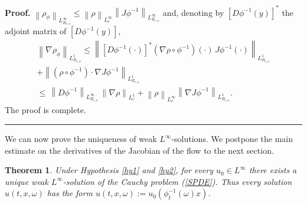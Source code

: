 \documentclass[a4paper,10pt]{article}
\newtheorem{theorem}{Theorem}
\newenvironment{proof}[1][Proof]{\textbf{#1.} }{\ \rule{0.5em}{0.5em}}
\begin{document}
\begin{proof}
$
\left\|  \rho_{\phi}\right\| _{L_{R_{r,\phi}}^{\infty}}\leq
\left\| \rho\right\| _{L_{r}^{\infty}}\left\|
J\phi^{-1}\right\| _{L_{R_{r,\phi }}^{\infty}}
$
and, denoting by $[D\phi^{-1}(y)]^*$ the adjoint matrix of
 $[D\phi^{-1}(y)]$,
\begin{align*}
\left\|  \nabla\rho_{\phi}\right\|  _{L_{R_{r,\phi}}^{1}}
\leq\left\| [D\phi^{-1}(\cdot)]^* \left(
\nabla\rho\circ\phi^{-1}\right)(\cdot) \, J\phi^{-1}\left(
\cdot\right) \right\| _{L_{R_{r,\phi}}^{1}}\\
+\left\| \left(
\rho\circ\phi^{-1}\right) \cdot\nabla J\phi^{-1}\right\|
_{L_{R_{r,\phi}}^{1}}
 \\
 \leq  \, \left\| D\phi^{-1}
  \right\|_{L_{R_{r,\phi}}^{\infty}}   \, \left\|
\nabla\rho\right\| _{L_{r}^{1}}+
   \left\|
\rho\right\|  _{L_{r}^{\infty}}\left\|  \nabla J\phi^{-1}\right\|
_{L_{R_{r,\phi}}^{1}}.
\end{align*}
The proof is complete.
\end{proof}

\vskip 2mm We can now prove the uniqueness of weak
$L^{\infty}$-solutions. We postpone
 the main estimate on the derivatives
 of the Jacobian of the flow to the next section.

\begin{theorem}
\label{thm SPDE n2} Under Hypothesis \ref{hy1} and \ref{hy2}, for every $u_{0}\in
L^{\infty}$ there exists a unique weak $L^{\infty}$-solution of
the Cauchy problem (\ref{SPDE}). Thus every solution
$u(t,x,\omega)$ has the form
$u(t,x,\omega):=u_{0}({\phi}_{t}^{-1}\left(  \omega\right)  x)$.
\end{theorem}
\end{document}
